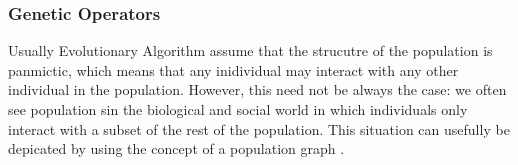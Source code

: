\documentclass{article}
\begin{document}
\subsubsection{Genetic Operators}

Usually Evolutionary Algorithm assume that the strucutre of the population is
panmictic, which means that any inidividual may interact with any other individual in the population.
However, this need not be always the case: we often see population sin the
biological and social world in which individuals only interact with a subset of
the rest of the population. This situation can usefully be depicated by using
the concept of a population graph \cite{hoekstra2010simulating}.

{}

\end{document}
